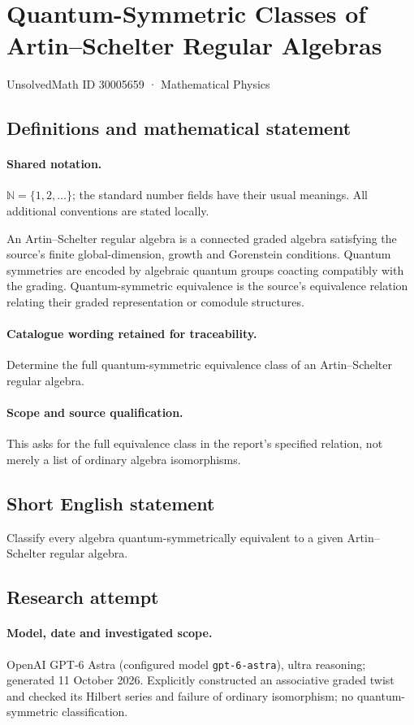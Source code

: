 \documentclass[11pt]{article}
\begin{document}
\setcounter{section}{30005658}
\section{Quantum-Symmetric Classes of Artin–Schelter Regular Algebras}\label{30005659}
{\small UnsolvedMath ID 30005659 · Mathematical Physics}
\subsection{Definitions and mathematical statement}

\paragraph{Shared notation.}$\mathbb N=\{1,2,\ldots\}$; the standard number fields have their usual meanings. All additional conventions are stated locally.


An Artin--Schelter regular algebra is a connected graded algebra satisfying the source's finite global-dimension, growth and Gorenstein conditions. Quantum symmetries are encoded by algebraic quantum groups coacting compatibly with the grading. Quantum-symmetric equivalence is the source's equivalence relation relating their graded representation or comodule structures.

\paragraph{Catalogue wording retained for traceability.}
Determine the full quantum-symmetric equivalence class of an Artin–Schelter regular algebra.

\paragraph{Scope and source qualification.}This asks for the full equivalence class in the report's specified relation, not merely a list of ordinary algebra isomorphisms.
\subsection{Short English statement}
Classify every algebra quantum-symmetrically equivalent to a given Artin--Schelter regular algebra.
\subsection{Research attempt}
\paragraph{Model, date and investigated scope.}
OpenAI GPT-6 Astra (configured model \texttt{gpt-6-astra}), ultra reasoning; generated 11 October 2026. Explicitly constructed an associative graded twist and checked its Hilbert series and failure of ordinary isomorphism; no quantum-symmetric classification.
\end{document}
